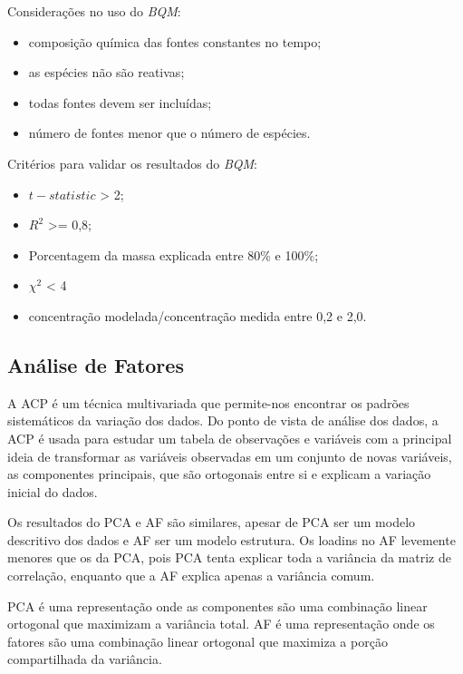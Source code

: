Considerações no uso do \textit{BQM}: 
\begin{itemize}
  \item composição química das fontes constantes no tempo;
  \item as espécies não são reativas;
  \item todas fontes devem ser incluídas;
  \item número de fontes menor que o número de espécies.
\end{itemize}


Critérios para validar os resultados do \textit{BQM}:

\begin{itemize}
  \item $t-statistic$ > 2;
  \item $R^2$ >= 0,8;
  \item Porcentagem da massa explicada entre 80\% e 100\%; 
  \item ${\chi}^2$ < 4
  \item concentração modelada/concentração medida entre 0,2 e 2,0.
\end{itemize}

\subsection{Análise de Fatores}

A ACP é um técnica multivariada que permite-nos encontrar os padrões 
sistemáticos da variação dos dados. 
Do ponto de vista de análise dos dados, a ACP é usada para estudar um 
tabela de observações e variáveis com a principal ideia de transformar 
as variáveis observadas em um conjunto de novas variáveis, 
as componentes principais, que são ortogonais entre si 
e explicam a variação inicial do dados.

Os resultados do PCA e AF são similares, apesar de PCA ser um modelo
descritivo dos dados e AF ser um modelo estrutura. 
Os loadins no AF levemente menores que os da PCA, pois PCA tenta
explicar toda a variância da matriz de correlação, enquanto que a AF
explica apenas a variância comum. 

PCA é uma representação onde as componentes são uma combinação linear 
ortogonal que maximizam a variância total.
AF é uma representação onde os fatores são uma combinação linear ortogonal
que maximiza a porção compartilhada da variância. 

